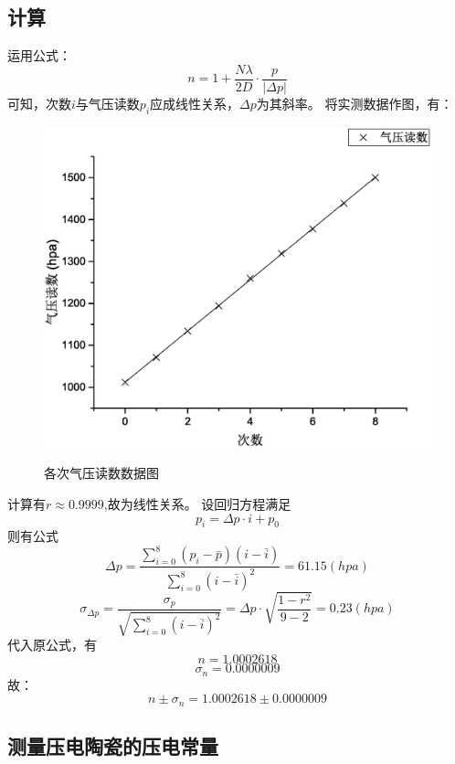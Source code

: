 \documentclass{ctexart}
\begin{document}
    \subsection{计算}
    运用公式：
    $$n=1+\frac{N\lambda}{2D}\cdot\frac{p}{|\Delta p|}$$
    可知，次数$i$与气压读数$p_i$应成线性关系，$\Delta p$为其斜率。
    将实测数据作图，有：
    \begin{figure}[H]
      \centering
      \caption{各次气压读数数据图}
      \includegraphics[width=\textwidth]{1}
      \label{fig:digit}
    \end{figure}
    计算有$r\approx0.9999$,故为线性关系。
    设回归方程满足$$p_i=\Delta p\cdot i+p_0$$
    则有公式$$\Delta p=\frac{\sum\limits_{i=0}^{8}{({p}_i-\bar{p})(i-\bar{i})}}{\sum\limits_{i=0}^{8}{(i-\bar{i})^2}}=61.15(hpa)$$
      $$\sigma_{\Delta p}=\frac{\sigma_{p}}{\sqrt{\sum\limits_{i=0}^{8}{(i-\bar i)^2}}}=\Delta p \cdot \sqrt{\frac{1-r^2}{9-2}}=0.23(hpa)$$
      代入原公式，有
      $$n=1.0002618$$
      $$\sigma_n=0.0000009$$
      故：$$n\pm\sigma_n=1.0002618\pm0.0000009$$

      \subsection{测量压电陶瓷的压电常量}
\end{document}
